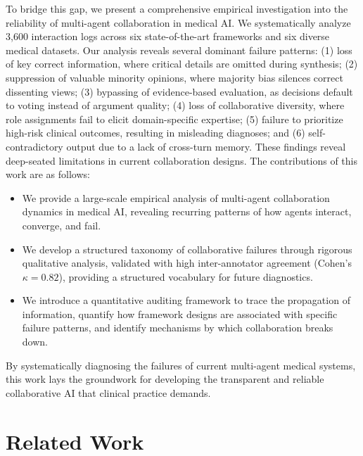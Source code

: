 To bridge this gap, we present a comprehensive empirical investigation into the reliability of multi-agent collaboration in medical AI. We systematically analyze 3,600 interaction logs across six state-of-the-art frameworks and six diverse medical datasets. Our analysis reveals several dominant failure patterns: (1) loss of key correct information, where critical details are omitted during synthesis; (2) suppression of valuable minority opinions, where majority bias silences correct dissenting views; (3) bypassing of evidence-based evaluation, as decisions default to voting instead of argument quality; (4) loss of collaborative diversity, where role assignments fail to elicit domain-specific expertise; (5) failure to prioritize high-risk clinical outcomes, resulting in misleading diagnoses; and (6) self-contradictory output due to a lack of cross-turn memory. These findings reveal deep-seated limitations in current collaboration designs. The contributions of this work are as follows:
\begin{itemize}
    \item We provide a large-scale empirical analysis of multi-agent collaboration dynamics in medical AI, revealing recurring patterns of how agents interact, converge, and fail.
    \item We develop a structured taxonomy of collaborative failures through rigorous qualitative analysis, validated with high inter-annotator agreement (Cohen's $\kappa=0.82$), providing a structured vocabulary for future diagnostics.
    \item We introduce a quantitative auditing framework to trace the propagation of information, quantify how framework designs are associated with specific failure patterns, and identify mechanisms by which collaboration breaks down.
\end{itemize}

By systematically diagnosing the failures of current multi-agent medical systems, this work lays the groundwork for developing the transparent and reliable collaborative AI that clinical practice demands.

\section{Related Work}


